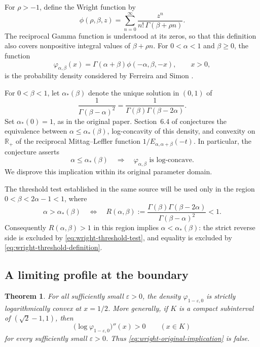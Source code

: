 \documentclass[11pt,a4paper]{article}
\newtheorem{theorem}{Theorem}[section]
\theoremstyle{definition}
\theoremstyle{remark}
\numberwithin{equation}{section}
\begin{document}
For $\rho>-1$, define the Wright function by
\[
 \phi(\rho,\beta,z)
 =\sum_{n=0}^{\infty}\frac{z^n}{n!\,\Gamma(\beta+\rho n)}.
\]
The reciprocal Gamma function is understood at its zeros, so that this
definition also covers nonpositive integral values of $\beta+\rho n$.
For $0<\alpha<1$ and $\beta\geq0$, the function
\[
 \varphi_{\alpha,\beta}(x)
 =\Gamma(\alpha+\beta)\phi(-\alpha,\beta,-x),\qquad x>0,
\]
is the probability density considered by Ferreira and Simon
\cite{FerreiraSimon2024}.

For $0<\beta<1$, let $\alpha_*(\beta)$ denote the unique solution in
$(0,1)$ of
\begin{equation}
 \frac{1}{\Gamma(\beta-\alpha)^2}
 =\frac{1}{\Gamma(\beta)\Gamma(\beta-2\alpha)}.
 \label{eq:wright-threshold-definition}
\end{equation}
Set $\alpha_*(0)=1$, as in the original paper. Section~6.4 of
\cite{FerreiraSimon2024} conjectures the equivalence between
$\alpha\leq\alpha_*(\beta)$, log-concavity of this density, and convexity
on $\mathbb R_+$ of the reciprocal Mittag--Leffler function
$1/E_{\alpha,\alpha+\beta}(-t)$. In particular, the conjecture asserts
\begin{equation}
 \alpha\leq\alpha_*(\beta)
 \quad\Longrightarrow\quad
 \varphi_{\alpha,\beta}\text{ is log-concave}.
 \label{eq:wright-original-implication}
\end{equation}
We disprove this implication within its original parameter domain.

The threshold test established in the same source will be used only in
the region $0<\beta<2\alpha-1<1$, where
\begin{equation}
 \alpha>\alpha_*(\beta)
 \quad\Longleftrightarrow\quad
 R(\alpha,\beta):=
 \frac{\Gamma(\beta)\Gamma(\beta-2\alpha)}
      {\Gamma(\beta-\alpha)^2}<1.
 \label{eq:wright-threshold-test}
\end{equation}
Consequently $R(\alpha,\beta)>1$ in this region implies
$\alpha<\alpha_*(\beta)$: the strict reverse side is excluded by
\eqref{eq:wright-threshold-test}, and equality is excluded by
\eqref{eq:wright-threshold-definition}.

\subsection{A limiting profile at the boundary}

\begin{theorem}
\label{thm:wright-boundary}
For all sufficiently small $\varepsilon>0$, the density
$\varphi_{1-\varepsilon,0}$ is strictly logarithmically convex at
$x=1/2$. More generally, if $K$ is a compact subinterval of
$(\sqrt2-1,1)$, then
\[
 \bigl(\log\varphi_{1-\varepsilon,0}\bigr)''(x)>0
 \qquad(x\in K)
\]
for every sufficiently small $\varepsilon>0$. Thus
\eqref{eq:wright-original-implication} is false.
\end{theorem}
\end{document}
